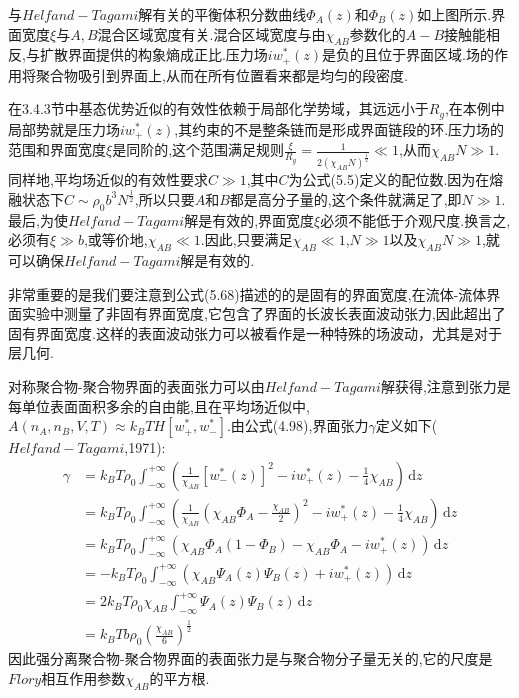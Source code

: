 与$Helfand−Tagami$解有关的平衡体积分数曲线$\Phi_{A}(z)$和$\Phi_{B}(z)$如上图所示.界面宽度$\xi$与$A,B$混合区域宽度有关.混合区域宽度与由$\chi_{AB}$参数化的$A−B$接触能相反,与扩散界面提供的构象熵成正比.压力场$iw_+^*(z)$是负的且位于界面区域.场的作用将聚合物吸引到界面上,从而在所有位置看来都是均匀的段密度.

在3.4.3节中基态优势近似的有效性依赖于局部化学势域，其远远小于$R_g$,在本例中局部势就是压力场$iw_+^*(z)$,其约束的不是整条链而是形成界面链段的环.压力场的范围和界面宽度$\xi$是同阶的,这个范围满足规则$\frac{\xi}{R_g} =\frac{1}{2(\chi_{AB}N)^{\frac{1}{2}}}\ll1$,从而$\chi_{AB}N\gg1$.同样地,平均场近似的有效性要求$C\gg1$,其中$C$为公式(5.5)定义的配位数.因为在熔融状态下$C\sim\rho_0b^3N^{\frac{1}{2}}$,所以只要$A$和$B$都是高分子量的,这个条件就满足了,即$N\gg1$.最后,为使$Helfand−Tagami$解是有效的,界面宽度$\xi $必须不能低于介观尺度.换言之,必须有$\xi \gg b$,或等价地,$\chi_{AB}\ll1$.因此,只要满足$\chi_{AB}\ll1$,$N\gg1$以及$\chi_{AB}N\gg1$,就可以确保$Helfand−Tagami$解是有效的.
	
非常重要的是我们要注意到公式(5.68)描述的的是固有的界面宽度,在流体-流体界面实验中测量了非固有界面宽度,它包含了界面的长波长表面波动张力,因此超出了固有界面宽度.这样的表面波动张力可以被看作是一种特殊的场波动，尤其是对于层几何.

对称聚合物-聚合物界面的表面张力可以由$Helfand−Tagami$解获得,注意到张力是每单位表面面积多余的自由能,且在平均场近似中,$A(n_A,n_B,V,T)\approx k_BTH[w_+^*,w_-^*]$.由公式(4.98),界面张力$\gamma$定义如下($Helfand−Tagami$,1971):
\begin{equation}
\begin{aligned}
\gamma&=k_B T \rho_0\int_{-\infty}^{+\infty}(\frac{1}{\chi_{AB}}[w_-^*(z)]^2-iw_+^*(z)-\frac{1}{4}\chi_{AB})\,\mathrm{d}z\\
&=k_B T\rho_0\int_{-\infty}^{+\infty}\left(\frac{1}{\chi_{AB}}(\chi_{AB}\Phi_{A}-\frac{\chi_{AB}}{2})^2-iw_+^*(z)-\frac{1}{4}\chi_{AB}\right)\,\mathrm{d}z\\
&=k_B T\rho_0\int_{-\infty}^{+\infty}\left(\chi_{AB}\Phi_{A}(1-\Phi_{B})-\chi_{AB}\Phi_{A}-iw_+^*(z)\right)\,\mathrm{d}z\\
&=-k_B T \rho_0\int_{-\infty}^{+\infty}(\chi_{AB}\Psi_{A}(z)\Psi_{B}(z)+iw_+^*(z))\,\mathrm{d}z\\
&=2k_B T \rho_0\chi_{AB}\int_{-\infty}^{+\infty}\Psi_{A}(z)\Psi_{B}(z)\,\mathrm{d}z\\
&=k_B T b \rho_0(\frac{\chi_{AB}}{6})^{\frac{1}{2}}
\end{aligned}
\end{equation}
因此强分离聚合物-聚合物界面的表面张力是与聚合物分子量无关的,它的尺度是$Flory$相互作用参数$\chi_{AB}$的平方根.

